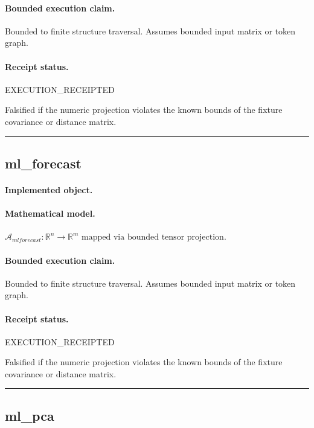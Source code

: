 \paragraph{Bounded execution claim.} Bounded to finite structure traversal. Assumes bounded input matrix or token graph.
\paragraph{Receipt status.} EXECUTION\_RECEIPTED
\begin{falsifier}
Falsified if the numeric projection violates the known bounds of the fixture covariance or distance matrix.
\end{falsifier}

\vspace{1em}\hrule\vspace{1em}
\subsection{ml\_forecast}
\paragraph{Implemented object.} 
\paragraph{Mathematical model.} $\mathcal{A}_{mlforecast} : \mathbb{R}^{n} \to \mathbb{R}^{m} \text{ mapped via bounded tensor projection}.$
\paragraph{Bounded execution claim.} Bounded to finite structure traversal. Assumes bounded input matrix or token graph.
\paragraph{Receipt status.} EXECUTION\_RECEIPTED
\begin{falsifier}
Falsified if the numeric projection violates the known bounds of the fixture covariance or distance matrix.
\end{falsifier}

\vspace{1em}\hrule\vspace{1em}
\subsection{ml\_pca}

